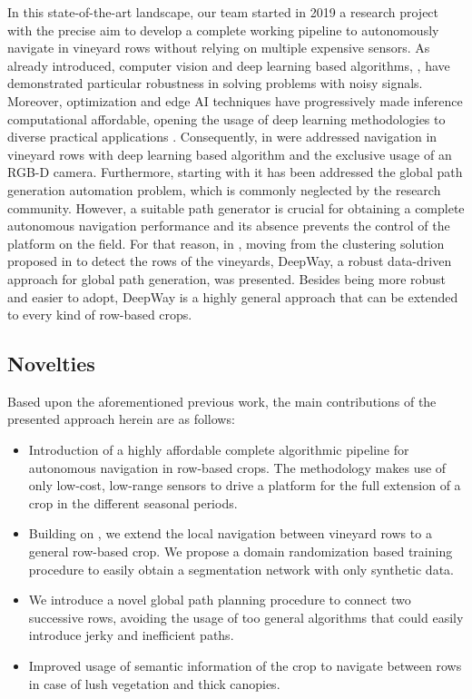 \documentclass[journal]{IEEEtran}
\begin{document}
In this state-of-the-art landscape, our team started in 2019 a research project with the precise aim to develop a complete working pipeline to autonomously navigate in vineyard rows without relying on multiple expensive sensors. As already introduced, computer vision and deep learning based algorithms, \cite{hinton2015nature}, have demonstrated particular robustness in solving problems with noisy signals. Moreover, optimization and edge AI techniques have progressively made inference computational affordable, opening the usage of deep learning methodologies to diverse practical applications  \cite{kamilaris2018deep}. Consequently, in \cite{aghi2020autonomous, aghi2021deep} were addressed navigation in vineyard rows with deep learning based algorithm and the exclusive usage of an RGB-D camera. Furthermore, starting with \cite{zoto2019automatic} it has been addressed the  global path generation automation problem, which is commonly neglected by the research community. However, a suitable path generator is crucial for obtaining a complete autonomous navigation performance and its absence prevents the control of the platform on the field. For that reason, in \cite{mazzia2021deepway}, moving from the clustering solution proposed in \cite{zoto2019automatic}
to detect the rows of the vineyards, DeepWay, a robust data-driven approach for global path generation, was presented. Besides being more robust and easier to adopt, DeepWay is a highly general approach that can be extended to every kind of row-based crops.
\vspace{-7pt}
\subsection{Novelties}
Based upon the aforementioned previous work, the main contributions of the presented approach herein are as follows:
\begin{itemize}
    \item Introduction of a highly affordable complete algorithmic pipeline for autonomous navigation in row-based crops. The methodology makes use of only low-cost, low-range sensors to drive a platform for the full extension of a crop in the different seasonal periods.
    \item Building on \cite{aghi2021deep}, we extend the local navigation between vineyard rows to a general row-based crop. We propose a domain randomization based training procedure to easily obtain a segmentation network with only synthetic data. 
    \item We introduce a novel global path planning procedure to connect two successive rows, avoiding the usage of too general algorithms that could easily introduce jerky and inefficient paths. 
    \item Improved usage of semantic information of the crop to navigate between rows in case of lush vegetation and thick canopies.
\end{itemize}
\end{document}
